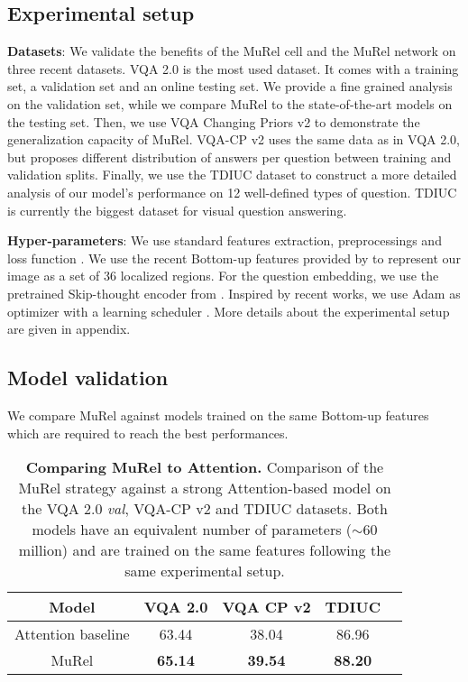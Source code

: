 \documentclass[10pt,twocolumn,letterpaper]{article}
\begin{document}
\subsection{Experimental setup}

\textbf{Datasets}: We validate the benefits of the MuRel cell and the MuRel network on three recent datasets. 
VQA 2.0 \cite{VQA2_Goyal_2017_CVPR} is the most used dataset. It comes with a training set, a validation set and an online testing set. We provide a fine grained analysis on the validation set, while we compare MuRel to the state-of-the-art models on the testing set.
Then, we use VQA Changing Priors v2 \cite{agrawal2018don} to demonstrate the generalization capacity of MuRel. VQA-CP v2 uses the same data as in VQA 2.0, but proposes different distribution of answers per question between training and validation splits.
Finally, we use the TDIUC dataset \cite{Kafle_2017_ICCV} to construct a more detailed analysis of our model's performance on 12 well-defined types of question. TDIUC is currently the biggest dataset for visual question answering.

\textbf{Hyper-parameters}: We use standard features extraction, preprocessings and loss function \cite{FukuiPYRDR16}. 
We use the recent Bottom-up features provided by \cite{Anderson_2018_CVPR} to represent our image as a set of 36 localized regions. 
For the question embedding, we use the pretrained Skip-thought encoder from \cite{Kiros2015}. 
Inspired by recent works, we use Adam as optimizer \cite{KingmaB14} with a learning scheduler \cite{pythia18arxiv}. 
More details about the experimental setup are given in appendix.

\subsection{Model validation}

We compare MuRel against models trained on the same Bottom-up features \cite{Anderson_2018_CVPR} which are required to reach the best performances.

\begin{table}[]
    \centering
    \begin{tabular}{*5{c}}
    \toprule
        Model & VQA 2.0 & VQA CP v2 & TDIUC \\
    \midrule
        Attention baseline & 63.44 & 38.04 & 86.96 \\ MuRel              & \textbf{65.14} & \textbf{39.54} & \textbf{88.20 }\\ \bottomrule
    \end{tabular}
    \vspace{0.1cm}
    \caption{\textbf{Comparing MuRel to Attention.} Comparison of the MuRel strategy against a strong Attention-based model on the VQA 2.0 \textit{val}, VQA-CP v2 and TDIUC datasets. Both models have an equivalent number of parameters ($\sim$60 million) and are trained on the same features following the same experimental setup.}
    \label{tab:model_validation}
\end{table}
\end{document}
